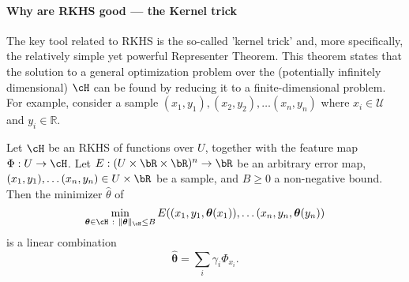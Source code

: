 \paragraph{Why are RKHS good --- the Kernel trick}
The key tool related to RKHS is the so-called 'kernel trick' and, more specifically, the relatively simple yet powerful Representer Theorem. This theorem states that the solution to a general optimization problem over the (potentially infinitely dimensional) $\cH$ can be found by reducing it to a finite-dimensional problem. For example,  consider a sample $(x_1, y_1), (x_2, y_2), \ldots (x_n, y_n)$ where $x_i \in \mathcal{U}$ and $y_i \in \mathbb{R}$. 
\begin{theorem}
\label{thm:representer}
    Let $\cH$ be an RKHS of functions over $U$, together with the feature map $\Phi: U \to \cH$. Let $E : (U \times \bR \times \bR)^n \to \bR$ be an arbitrary error map,  $(x_1, y_1), \ldots (x_n, y_n) \in U \times \bR$ be a sample, and $B \geq 0$ a non-negative bound. Then the minimizer $\hat{\theta}$ of
    \begin{equation}
        \min_{\boldsymbol{\theta} \in \cH ~ : ~ \|\boldsymbol{\theta}\|_{\cH} \leq B} E((x_1, y_1, \boldsymbol{\theta}(x_1)), \ldots (x_n, y_n, \boldsymbol{\theta}(y_n))
    \end{equation}
    is a linear combination
    \begin{equation}
        \hat{\boldsymbol{\theta}} = \sum_i \gamma_i \Phi_{x_i}.
    \end{equation}
\end{theorem}
